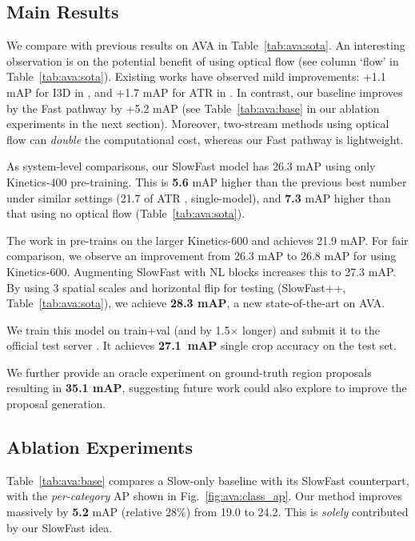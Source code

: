 \documentclass[10pt,twocolumn,letterpaper]{article}
\newcommand{\figref}[1]{Fig.~\ref{#1}}
\newcommand{\tblref}[1]{Table~\ref{#1}}
\begin{document}
	\subsection{Main Results}
	
	We compare with previous results on AVA in \tblref{tab:ava:sota}. An interesting observation is on the potential benefit of using optical flow (see column `flow' in \tblref{tab:ava:sota}). Existing works have observed mild improvements: +1.1 mAP for I3D in \cite{Gu2018}, and +1.7 mAP for ATR in \cite{Jiang2018}. In contrast, our baseline improves by the Fast pathway by +5.2 mAP (see \tblref{tab:ava:base} in our ablation experiments in the next section). Moreover, two-stream methods using optical flow can \emph{double} the computational cost, whereas our Fast pathway is lightweight.
	
	As system-level comparisons, our SlowFast model has 26.3 mAP using only Kinetics-400 pre-training. This is \textbf{5.6} mAP higher than the previous best number under similar settings (21.7 of ATR \cite{Jiang2018}, single-model), and \textbf{7.3} mAP higher than that using no optical flow (\tblref{tab:ava:sota}). 
	
	The work in \cite{Girdhar2018} pre-trains on the larger Kinetics-600 and achieves 21.9 mAP. For fair comparison, we observe an improvement from 26.3 mAP to 26.8 mAP for using Kinetics-600. Augmenting SlowFast with NL blocks \cite{Wang2018} increases this to 27.3 mAP. By using 3 spatial scales and horizontal flip for testing (SlowFast++, \tblref{tab:ava:sota}), we achieve \textbf{28.3 mAP}, a new state-of-the-art on AVA. 
	
	We train this model on train+val (and by 1.5$\times$ longer) and submit it to the official test server \cite{AVALeaverboard2018}. It achieves \textbf{27.1~mAP} single crop accuracy on the test set. %
	
	We further provide an oracle experiment on ground-truth region proposals resulting in \textbf{35.1 mAP}, suggesting future work could also explore to improve the proposal generation. 

	
	\subsection{Ablation Experiments}\label{sec:ava:ablations}
	
	\tblref{tab:ava:base} compares a Slow-only baseline with its SlowFast counterpart, with the \emph{per-category} AP shown in \figref{fig:ava:class_ap}. Our method improves massively by \textbf{5.2} mAP (relative 28\%) from 19.0 to 24.2. This is \emph{solely} contributed by our SlowFast idea.
	
\end{document}
